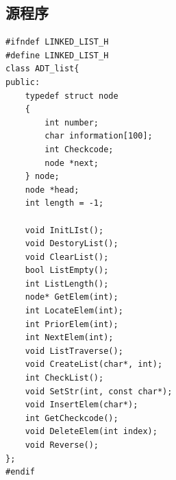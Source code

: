 \documentclass[a4paper,11pt,UTF8]{ctexart}
\begin{document}
\subsection{源程序}
\begin{lstlisting}[caption=Linked\_list.h,captionpos=b]
#ifndef LINKED_LIST_H
#define LINKED_LIST_H
class ADT_list{
public:
    typedef struct node
    {
        int number;
        char information[100];
        int Checkcode;
        node *next;
    } node;
    node *head;
    int length = -1;

    void InitLIst();
    void DestoryList();
    void ClearList();
    bool ListEmpty();
    int ListLength();
    node* GetElem(int);
    int LocateElem(int);
    int PriorElem(int);
    int NextElem(int);
    void ListTraverse();
    void CreateList(char*, int);
    int CheckList();
    void SetStr(int, const char*);
    void InsertElem(char*);
    int GetCheckcode();
    void DeleteElem(int index);
    void Reverse();
};
#endif
\end{lstlisting}
\end{document}
